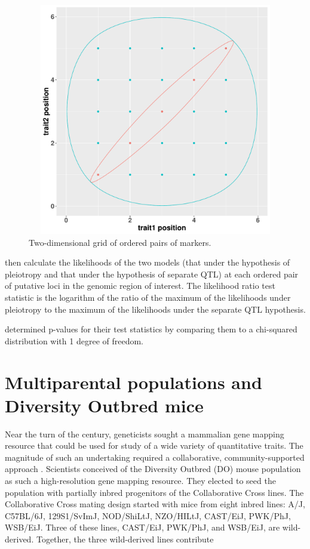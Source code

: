 \documentclass[oneside]{book}\usepackage[]{graphicx}\usepackage[]{color}
\newenvironment{knitrout}{}{} %
\begin{document}
\begin{knitrout}
\color{fgcolor}\begin{figure}
\includegraphics[width=6in,height=4in]{figure/encircle-1} \caption[Two-dimensional grid of ordered pairs of markers]{Two-dimensional grid of ordered pairs of markers.}\label{fig:encircle}
\end{figure}


\end{knitrout}



\citet{jiang1995multiple} then calculate the likelihoods of the two models
(that under the hypothesis of pleiotropy and that under the hypothesis of separate QTL)
at each ordered pair of putative loci in the genomic region of interest.
The likelihood ratio test statistic is the logarithm of the ratio of the maximum
of the likelihoods under pleiotropy to the maximum of the likelihoods under
the separate QTL hypothesis. 

\citet{jiang1995multiple} determined p-values for their test statistics by comparing
them to a chi-squared distribution with 1 degree of freedom. 





\section{Multiparental populations and Diversity Outbred mice}

Near the turn of the century, geneticists sought a mammalian gene mapping resource 
that could be used for study of a wide variety of quantitative traits. 
The magnitude of such an undertaking required a collaborative, community-supported
approach \citep{de2014genetics}. Scientists conceived of the Diversity Outbred (DO)
mouse population as such a high-resolution gene mapping resource.
They elected to seed the population with partially inbred progenitors of the
Collaborative Cross lines. The Collaborative Cross mating design started with
mice from eight inbred lines: A/J, C57BL/6J, 129S1/SvImJ,
NOD/ShiLtJ, NZO/HILtJ, CAST/EiJ, PWK/PhJ, WSB/EiJ. Three of these lines, CAST/EiJ, PWK/PhJ, and WSB/EiJ, are wild-derived. Together, the three wild-derived lines contribute 
\end{document}
